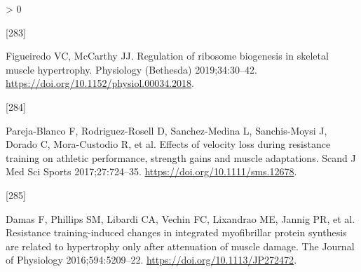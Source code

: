 \documentclass[twoside,10pt]{gihclass} %
\newlength{\cslhangindent}
\newlength{\csllabelwidth}
\newenvironment{CSLReferences}[3] %
 {%
  \setlength{\parindent}{0pt}
  \ifodd #1 \everypar{\setlength{\hangindent}{\cslhangindent}}\ignorespaces\fi
  \ifnum #2 > 0
  \setlength{\parskip}{#2\baselineskip}
  \fi
 }%
 {}
\newcommand{\CSLLeftMargin}[1]{\parbox[t]{\maxof{\widthof{#1}}{\csllabelwidth}}{#1}}
\newcommand{\CSLRightInline}[1]{\parbox[t]{\linewidth}{#1}}
\begin{document}
\begin{CSLReferences}{0}{0}
\leavevmode\hypertarget{ref-RN2142}{}%
\CSLLeftMargin{{[}283{]} }
\CSLRightInline{Figueiredo VC, McCarthy JJ. Regulation of ribosome biogenesis in skeletal muscle hypertrophy. Physiology (Bethesda) 2019;34:30--42. \url{https://doi.org/10.1152/physiol.00034.2018}.}

\leavevmode\hypertarget{ref-RN2217}{}%
\CSLLeftMargin{{[}284{]} }
\CSLRightInline{Pareja-Blanco F, Rodriguez-Rosell D, Sanchez-Medina L, Sanchis-Moysi J, Dorado C, Mora-Custodio R, et al. Effects of velocity loss during resistance training on athletic performance, strength gains and muscle adaptations. Scand J Med Sci Sports 2017;27:724--35. \url{https://doi.org/10.1111/sms.12678}.}

\leavevmode\hypertarget{ref-RN2144}{}%
\CSLLeftMargin{{[}285{]} }
\CSLRightInline{Damas F, Phillips SM, Libardi CA, Vechin FC, Lixandrao ME, Jannig PR, et al. Resistance training-induced changes in integrated myofibrillar protein synthesis are related to hypertrophy only after attenuation of muscle damage. The Journal of Physiology 2016;594:5209--22. \url{https://doi.org/10.1113/JP272472}.}

\end{CSLReferences}

\end{document}
